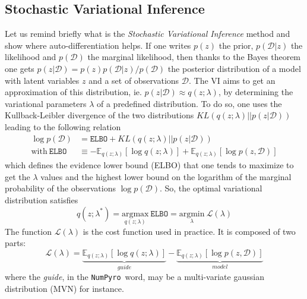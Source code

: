 \documentclass[final,5p,times,twocolumn,authoryear]{elsarticle}
\newcommand{\numpyro}{\texttt{NumPyro}}
\begin{document}
\subsection{Stochastic Variational Inference}
%
Let us remind briefly what is the \textit{Stochastic Variational Inference} method \citep{2012arXiv1206.7051H, 2017arXiv171105597Z} and show where auto-differentiation helps. If one  writes $p(z)$ the prior, $p(\mathcal{D}|z)$ the likelihood and $p(\mathcal{D})$ the marginal likelihood, then thanks to the  Bayes theorem one gets $p(z|\mathcal{D})=p(z)p(\mathcal{D}|z)/p(\mathcal{D})$ the posterior distribution of a model with latent variables $z$ and a set of observations $\mathcal{D}$. The VI aims to get an approximation of this distribution, ie. $p(z|\mathcal{D}) \approx q(z;\lambda)$, by determining the variational parameters $\lambda$ of a predefined distribution. To do so, one uses the Kullback-Leibler divergence of the two distributions $KL(q(z;\lambda)||p(z|\mathcal{D}))$ leading to the following relation
\begin{align}
\log p(\mathcal{D}) &= \mathtt{ELBO} +  KL(q(z;\lambda)||p(z|\mathcal{D})) \label{eq-ELBO} \\
\mathrm{with} \ \mathtt{ELBO} &\equiv -\mathbb{E}_{q(z;\lambda)}\left[ \log q(z;\lambda)\right] + \mathbb{E}_{q(z;\lambda)}\left[ \log p(z,\mathcal{D}) \right] 
\end{align}
which defines the evidence lower bound (ELBO) that one tends to maximize to get the $\lambda$ values and the  highest lower bound on the logarithm of the marginal probability of the observations $\log p(\mathcal{D})$. So, the optimal variational distribution satisfies
\begin{equation}
q(z;\lambda^\ast) = \underset{q(z;\lambda)}{\mathrm{argmax}}\  \mathtt{ELBO} = 
\underset{\lambda}{\mathrm{argmin}}\ \mathcal{L}(\lambda)
\end{equation}
The function $\mathcal{L}(\lambda)$ is the cost function used in practice. It is composed of two parts:
\begin{equation}
\mathcal{L}(\lambda) = \underbrace{\mathbb{E}_{q(z;\lambda)}\left[ \log q(z;\lambda)\right]}_{guide} - \underbrace{\mathbb{E}_{q(z;\lambda)}\left[ \log p(z,\mathcal{D}) \right]}_{model}
\label{eq-loss-svi-1}
\end{equation}
where the \textit{guide}, in the \numpyro\ word, may be a multi-variate gaussian distribution (MVN) for instance. 
\end{document}
